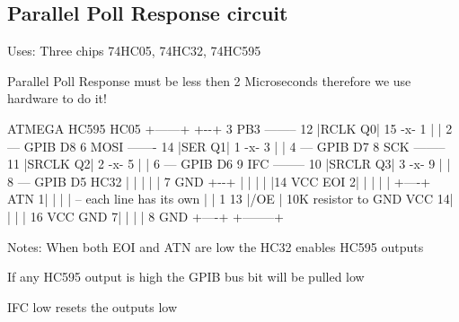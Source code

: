 \subsection*{Parallel Poll Response circuit}


\begin{DoxyItemize}
\item Uses\-: Three chips 74\-H\-C05, 74\-H\-C32, 74\-H\-C595
\item Parallel Poll Response must be less then 2 Microseconds therefore we use hardware to do it!
\end{DoxyItemize}

\begin{DoxyVerb} ATMEGA            HC595            HC05 
                   +---\/---+          +-\/-+  
 3 PB3 -------- 12 |RCLK  Q0| 15 -x- 1 |    | 2 --- GPIB D8 
 6 MOSI ------- 14 |SER   Q1| 1  -x- 3 |    | 4 --- GPIB D7 
 8 SCK -------- 11 |SRCLK Q2| 2  -x- 5 |    | 6 --- GPIB D6 
 9 IFC -------- 10 |SRCLR Q3| 3  -x- 9 |    | 8 --- GPIB D5 
       HC32        |        |     |    |    | 7 GND 
       +-\/-+      |        |     |    |    |14 VCC 
  EOI 2|    |      |        |     |    +----+ 
  ATN 1|    |      |        |     \--- each line has its own 
       |    | 1 13 |/OE     |          10K resistor to GND 
 VCC 14|    |      |        | 16 VCC 
 GND  7|    |      |        |  8 GND 
       +----+      +--------+ 
\end{DoxyVerb}


Notes\-: When both E\-O\-I and A\-T\-N are low the H\-C32 enables H\-C595 outputs
\begin{DoxyItemize}
\item If any H\-C595 output is high the G\-P\-I\-B bus bit will be pulled low
\item I\-F\-C low resets the outputs low 
\end{DoxyItemize}